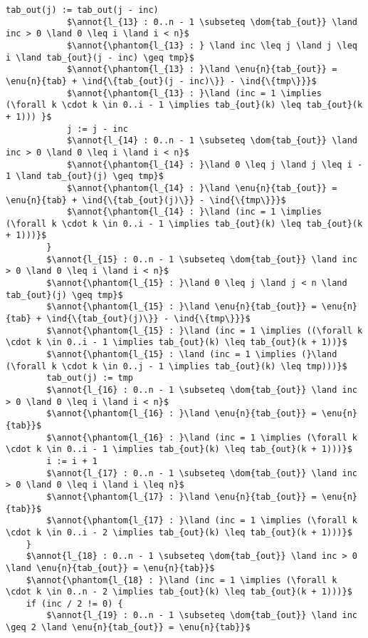 \documentclass[a4paper, 11pt]{article}
\DeclareMathOperator{\eenu}{Enum}
\DeclareMathOperator{\ddom}{Dom}
\newcommand{\dom}[1]{\ddom\left(#1\right)}
\newcommand{\enu}[2]{\eenu_{\substack{#1}}\left(#2\right)}
\newcommand{\ind}[1]{\chi_{#1}}
\theoremstyle{mystyle}
\newcommand{\annot}[1]{{\color{black} #1}}
\begin{document}
\begin{lstlisting}[language=prooflang, mathescape,
    basicstyle=\ttfamily\large\color{blue!90!black},
    keywordstyle=\bfseries,
    tabsize=4]
            tab_out(j) := tab_out(j - inc)
            $\annot{l_{13} : 0..n - 1 \subseteq \dom{tab_{out}} \land inc > 0 \land 0 \leq i \land i < n}$
            $\annot{\phantom{l_{13} : } \land inc \leq j \land j \leq i \land tab_{out}(j - inc) \geq tmp}$
            $\annot{\phantom{l_{13} : }\land \enu{n}{tab_{out}} = \enu{n}{tab} + \ind{\{tab_{out}(j - inc)\}} - \ind{\{tmp\}}}$
            $\annot{\phantom{l_{13} : }\land (inc = 1 \implies (\forall k \cdot k \in 0..i - 1 \implies tab_{out}(k) \leq tab_{out}(k + 1))) }$
            j := j - inc
            $\annot{l_{14} : 0..n - 1 \subseteq \dom{tab_{out}} \land inc > 0 \land 0 \leq i \land i < n}$
            $\annot{\phantom{l_{14} : }\land 0 \leq j \land j \leq i - 1 \land tab_{out}(j) \geq tmp}$
            $\annot{\phantom{l_{14} : }\land \enu{n}{tab_{out}} = \enu{n}{tab} + \ind{\{tab_{out}(j)\}} - \ind{\{tmp\}}}$
            $\annot{\phantom{l_{14} : }\land (inc = 1 \implies (\forall k \cdot k \in 0..i - 1 \implies tab_{out}(k) \leq tab_{out}(k + 1)))}$
        }
        $\annot{l_{15} : 0..n - 1 \subseteq \dom{tab_{out}} \land inc > 0 \land 0 \leq i \land i < n}$
        $\annot{\phantom{l_{15} : }\land 0 \leq j \land j < n \land tab_{out}(j) \geq tmp}$
        $\annot{\phantom{l_{15} : }\land \enu{n}{tab_{out}} = \enu{n}{tab} + \ind{\{tab_{out}(j)\}} - \ind{\{tmp\}}}$
        $\annot{\phantom{l_{15} : }\land (inc = 1 \implies ((\forall k \cdot k \in 0..i - 1 \implies tab_{out}(k) \leq tab_{out}(k + 1))}$
        $\annot{\phantom{l_{15} : \land (inc = 1 \implies (}\land (\forall k \cdot k \in 0..j - 1 \implies tab_{out}(k) \leq tmp)))}$
        tab_out(j) := tmp
        $\annot{l_{16} : 0..n - 1 \subseteq \dom{tab_{out}} \land inc > 0 \land 0 \leq i \land i < n}$
        $\annot{\phantom{l_{16} : }\land \enu{n}{tab_{out}} = \enu{n}{tab}}$
        $\annot{\phantom{l_{16} : }\land (inc = 1 \implies (\forall k \cdot k \in 0..i - 1 \implies tab_{out}(k) \leq tab_{out}(k + 1)))}$
        i := i + 1
        $\annot{l_{17} : 0..n - 1 \subseteq \dom{tab_{out}} \land inc > 0 \land 0 \leq i \land i \leq n}$
        $\annot{\phantom{l_{17} : }\land \enu{n}{tab_{out}} = \enu{n}{tab}}$
        $\annot{\phantom{l_{17} : }\land (inc = 1 \implies (\forall k \cdot k \in 0..i - 2 \implies tab_{out}(k) \leq tab_{out}(k + 1)))}$
    }
    $\annot{l_{18} : 0..n - 1 \subseteq \dom{tab_{out}} \land inc > 0 \land \enu{n}{tab_{out}} = \enu{n}{tab}}$
    $\annot{\phantom{l_{18} : }\land (inc = 1 \implies (\forall k \cdot k \in 0..n - 2 \implies tab_{out}(k) \leq tab_{out}(k + 1)))}$
    if (inc / 2 != 0) {
        $\annot{l_{19} : 0..n - 1 \subseteq \dom{tab_{out}} \land inc \geq 2 \land \enu{n}{tab_{out}} = \enu{n}{tab}}$

\end{lstlisting}
\end{document}
